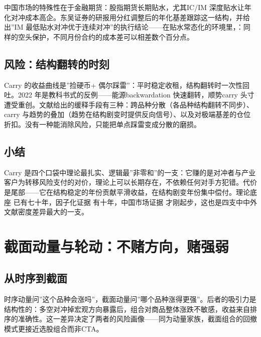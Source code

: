 \documentclass[12pt,a4paper]{ctexart}
\begin{document}
中国市场的特殊性在于金融期货：股指期货长期贴水，尤其IC/IM 深度贴水让年化对冲成本高企。东吴证券的研报用分红调整后的年化基差跟踪这一结构，并给出”IM 最低贴水对冲优于连续对冲”\hspace{0.3em}的执行结论\cite{60}——在贴水常态化的环境里，：同样的空头保护，不同月份合约的成本差可以相差数个百分点。


\subsection{风险：结构翻转的时刻}

Carry 的收益曲线是”\hspace{0.3em}捡硬币+ 偶尔踩雷”：平时稳定收租，结构翻转时一次性回吐。2022 年是教科书式的反例——能源backwardation 快速翻转，顺势carry 头寸遭受重创\cite{22}。文献给出的缓释手段有三种：跨品种分散（各品种结构翻转不同步）、carry 与趋势的叠加（趋势在结构剧变时提供反向信号\cite{22}）、以及对极端基差的仓位折扣\cite{58}。没有一种能消除风险，只能把单点踩雷变成分散的磨损。


\subsection{小结}

Carry 是四个口袋中理论最扎实、逻辑最”\hspace{0.3em}非零和”\hspace{0.3em}的一支：它赚的是对冲者与产业客户为转移风险支付的对价，理论上可以长期存在，不依赖任何对手方犯错。代价是尾部——它在结构稳定的年份贡献平滑收益，在结构剧变年份集中偿付。理论底座\cite{70, 71} 已有七十年，因子化证据\cite{53, 55, 56} 有十年，中国市场证据\cite{57, 60} 才刚起步，这也是四支中中外文献密度差异最大的一支。


\section{截面动量与轮动：不赌方向，赌强弱}

\subsection{从时序到截面}

时序动量问”\hspace{0.3em}这个品种会涨吗”，截面动量问”\hspace{0.3em}哪个品种涨得更强”\hspace{0.3em}\cite{03}。后者的吸引力是结构性的：多空对冲掉宏观方向暴露后，组合对商品整体涨跌不敏感，收益来自排序的准确性。这一差异决定了两者的风险画像——同为动量家族，截面组合的回撤模式更接近选股组合而非CTA。
\end{document}
